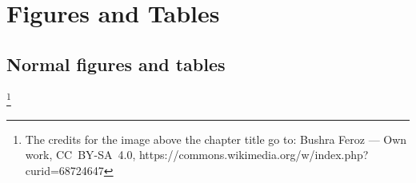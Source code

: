 \setchapterpreamble[u]{\margintoc[*-5]}

\makeatletter
\renewcommand{\chapterlinesformat}[3]{%
  \@hangfrom{#2}{#3}%
}
\makeatother
\renewcommand*{\chapterformat}{%
  \mbox{\chapappifchapterprefix{\nobreakspace}\thechapter
	\autodot\IfUsePrefixLine{}{\enskip}}}

\chapter{Figures and Tables}

\section{Normal figures and tables}

\footnote[0]{The credits for the image above the chapter title go to:
	Bushra Feroz --- Own work, CC~BY-SA~4.0, 
	https://commons.wikimedia.org/w/index.php?curid=68724647}

